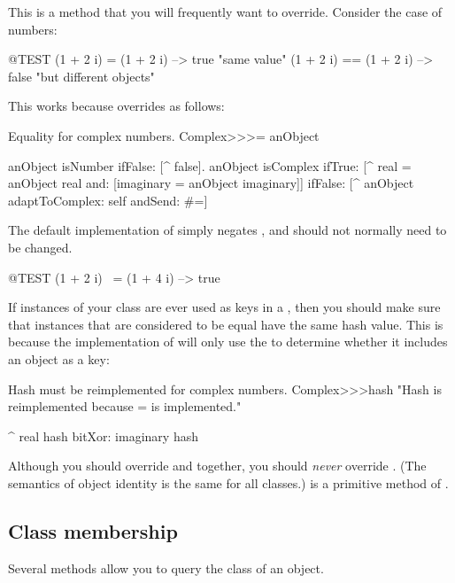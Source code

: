 \documentclass[a4paper,10pt,twoside]{book}
\begin{document}
This is a method that you will frequently want to override.
Consider the case of  numbers:

\begin{code}{@TEST}
(1 + 2 i) = (1 + 2 i)   --> true     "same value"
(1 + 2 i) == (1 + 2 i) --> false    "but different objects"
\end{code}

This works because  overrides \ct{=} as follows:
\begin{method}{Equality for complex numbers.}
Complex>>>= anObject

	anObject isNumber ifFalse: [^ false].
	anObject isComplex
		ifTrue: [^ real = anObject real and: [imaginary = anObject imaginary]]
		ifFalse: [^ anObject adaptToComplex: self andSend: #=]
\end{method}

The default implementation of  simply negates , and should not normally need to be changed.

\begin{code}{@TEST}
(1 + 2 i) ~= (1 + 4 i) --> true
\end{code}


If instances of your class are ever used as keys in a , then you should make sure that instances that are considered to be equal have the same hash value. This is because the implementation of  will only use the  to determine whether it includes an object as a key:
\begin{method}{Hash must be reimplemented for complex numbers.}
Complex>>>hash
    "Hash is reimplemented because = is implemented."

    ^ real hash bitXor: imaginary hash
\end{method}

Although you should override \ct{=} and  together, you should \emph{never} override \ct{==}.
(The semantics of object identity is the same for all classes.)
\ct{==} is a primitive method of .


\subsection{Class membership}
Several methods allow you to query the class of an object.
\end{document}

